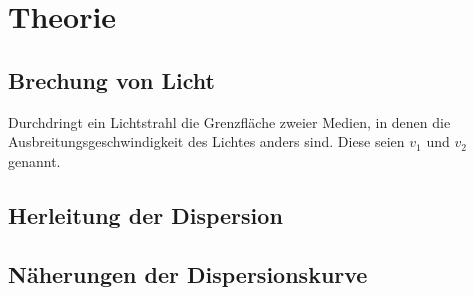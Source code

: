 \section{Theorie}
\label{sec:Theorie}
\subsection{Brechung von Licht}
Durchdringt ein Lichtstrahl die Grenzfläche zweier Medien, in denen die Ausbreitungsgeschwindigkeit
des Lichtes anders sind. Diese seien $v_1$ und $v_2$ genannt.
\label{subsec:brechung}
\subsection{Herleitung der Dispersion}
\label{subsec:dispersion1}
\subsection{Näherungen der Dispersionskurve}
\label{subsec:dispersion2}
